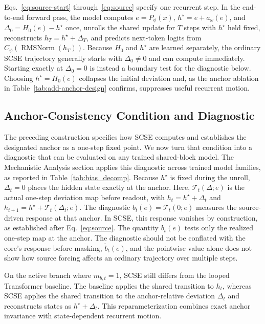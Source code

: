 \documentclass[letterpaper]{article} %
\newcommand{\SCSE}{\textsc{SCSE}}
\newcommand{\Tmap}{\mathcal{T}}
\theoremstyle{remark}
\begin{document}
Eqs.~\ref{eq:source-start} through~\ref{eq:source} specify one recurrent step.  In the end-to-end forward pass, the model computes $e=P_\phi(x)$, $h^\star=e+a_\omega(e)$, and $\Delta_0=H_0(e)-h^\star$ once, unrolls the shared update for $T$ steps with $h^\star$ held fixed, reconstructs $h_T=h^\star+\Delta_T$, and predicts next-token logits from $C_\psi(\operatorname{RMSNorm}(h_T))$.  Because $H_0$ and $h^\star$ are learned separately, the ordinary \SCSE{} trajectory generally starts with $\Delta_0\neq0$ and can compute immediately.  Starting exactly at $\Delta_0=0$ is instead a boundary test for the diagnostic below.  Choosing $h^\star=H_0(e)$ collapses the initial deviation and, as the anchor ablation in Table~\ref{tab:add-anchor-design} confirms, suppresses useful recurrent motion.

\subsection{Anchor-Consistency Condition and Diagnostic}
The preceding construction specifies how \SCSE{} computes and establishes the designated anchor as a one-step fixed point.  We now turn that condition into a diagnostic that can be evaluated on any trained shared-block model.  The Mechanistic Analysis section applies this diagnostic across trained model families, as reported in Table~\ref{tab:bias_decomp}.  Because $h^\star$ is fixed during the unroll, $\Delta_t=0$ places the hidden state exactly at the anchor.  Here, $\Tmap_t(\Delta;e)$ is the actual one-step deviation map before readout, with $h_t=h^\star+\Delta_t$ and $h_{t+1}=h^\star+\Tmap_t(\Delta_t;e)$.  The diagnostic $b_t(e)=\Tmap_t(0;e)$ measures the source-driven response at that anchor.  In \SCSE{}, this response vanishes by construction, as established after Eq.~\ref{eq:source}.  The quantity $b_t(e)$ tests only the realized one-step map at the anchor.  The diagnostic should not be conflated with the core's response before masking, $\widetilde b_t(e)$, and the pointwise value alone does not show how source forcing affects an ordinary trajectory over multiple steps.

On the active branch where $m_{b,t}=1$, \SCSE{} still differs from the looped Transformer baseline.  The baseline applies the shared transition to $h_t$, whereas \SCSE{} applies the shared transition to the anchor-relative deviation $\Delta_t$ and reconstructs states as $h^\star+\Delta_t$.  This reparameterization combines exact anchor invariance with state-dependent recurrent motion.
\end{document}
